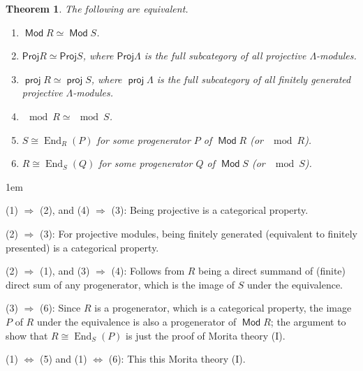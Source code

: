 \documentclass[11pt,a4paper]{article}
\makeatletter
\numberwithin{equation}{section}
\renewenvironment{proof}[1][\proofname]{\par
    \pushQED{\qed}%
    \normalfont \topsep0\p@\@plus6\p@ \labelsep1em\relax
    \trivlist
    \item[\hskip\labelsep\indent
        \bfseries #1]\ignorespaces
    \mbox{}
}{
    \popQED\endtrivlist\@endpefalse
}
\theoremstyle{all}
\newtheorem{theorem}{Theorem}[section]
\newtheorem{lemma}[theorem]{Lemma}
\theoremstyle{remark}
\newcommand{\Hom}{\operatorname{Hom}\nolimits}
\newcommand{\End}{\operatorname{End}\nolimits}
\DeclareMathOperator{\Mod}{\mathsf{Mod}}
\DeclareMathOperator{\proj}{\mathsf{proj}}
\makeatother
\begin{document}
\begin{theorem}
The following are equivalent.
\begin{enumerate}[\rm(1)]
\item $\Mod R\simeq \Mod S$.
\item $\mathsf{Proj}R \simeq \mathsf{Proj} S$, where $\mathsf{Proj}\Lambda$ is the full subcategory of all projective $\Lambda$-modules.
\item $\proj R\simeq \proj S$, where $\proj\Lambda$ is the full subcategory of all finitely generated projective $\Lambda$-modules.
\item $\mod R\simeq \mod S$.
\item $S\cong \End_R(P)$ for some progenerator $P$ of $\Mod R$ (or $\mod R$).
\item $R\cong \End_S(Q)$ for some progenerator $Q$ of $\Mod S$ (or $\mod S$).
\end{enumerate}
\end{theorem}
\begin{proof}
(1) $\Rightarrow$ (2), and (4) $\Rightarrow$ (3):  Being projective is a categorical property.

(2) $\Rightarrow$ (3):  For projective modules, being finitely generated (equivalent to finitely presented) is a categorical property.

(2) $\Rightarrow$ (1), and (3) $\Rightarrow$ (4): Follows from $R$ being a direct summand of (finite) direct sum of any progenerator, which is the image of $S$ under the equivalence.

(3) $\Rightarrow$ (6): Since $R$ is a progenerator, which is a categorical property, the image $P$ of $R$ under the equivalence is also a progenerator of $\Mod R$; the argument to show that $R\cong \End_S(P)$ is just the proof of Morita theory (I).

(1) $\Leftrightarrow$ (5) and (1) $\Leftrightarrow$ (6):  This this Morita theory (I).
\end{proof}


%
%
\end{document}
